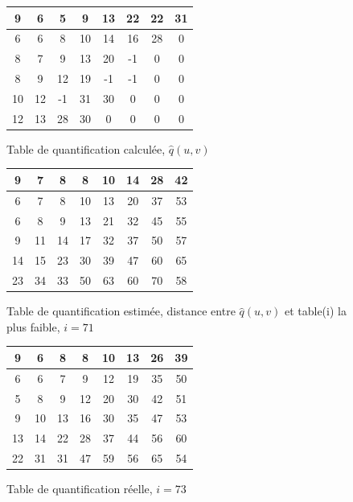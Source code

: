 \documentclass[utf8,final]{stageM2R} %
\begin{document}
\begin{figure}
  \centering
  \begin{tabular}{|c|c|c|c|c|c|c|c|}
    \hline
    9 & 6 & 5 & 9 & 13 & 22 & 22 & 31 \\ \hline    
    6 & 6 & 8 & 10 & 14 & 16 & 28 & 0 \\ \hline
    8 & 7 & 9 & 13 & 20 & -1 & 0 & 0 \\ \hline
    8 & 9 & 12 & 19 & -1 & -1 & 0 & 0 \\ \hline
    10 & 12 & -1 & 31 & 30 & 0 & 0 & 0 \\ \hline
    12 & 13 & 28 & 30 & 0 & 0 & 0 & 0 \\ \hline
  \end{tabular}
  \caption{Table de quantification calculée, $\widehat{q}(u,v)$}
  \label{periods1}
  
  \centering
  \begin{tabular}{|c|c|c|c|c|c|c|c|}
    \hline
    9 & 7 & 8 & 8 & 10 & 14 & 28 & 42 \\ \hline
    6 & 7 & 8 & 10 & 13 & 20 & 37 & 53 \\ \hline
    6 & 8 & 9 & 13 & 21 & 32 & 45 & 55 \\ \hline
    9 & 11 & 14 & 17 & 32 & 37 & 50 & 57 \\ \hline
    14 & 15 & 23 & 30 & 39 & 47 & 60 & 65 \\ \hline
    23 & 34 & 33 & 50 & 63 & 60 & 70 & 58 \\ \hline
  \end{tabular}
  \caption{Table de quantification estimée, distance entre $\widehat{q}(u,v)$ et table(i) la plus faible, $i = 71$}
  \label{periods2}
  
  \centering
  \begin{tabular}{|c|c|c|c|c|c|c|c|}
    \hline
    9 & 6 & 8 & 8 & 10 & 13 & 26 & 39  \\ \hline
    6 & 6 & 7 & 9 & 12 & 19 & 35 & 50  \\ \hline
    5 & 8 & 9 & 12 & 20 & 30 & 42 & 51  \\ \hline
    9 & 10 & 13 & 16 & 30 & 35 & 47 & 53  \\ \hline
    13 & 14 & 22 & 28 & 37 & 44 & 56 & 60  \\ \hline
    22 & 31 & 31 & 47 & 59 & 56 & 65 & 54  \\ \hline
  \end{tabular}
  \caption{Table de quantification réelle, $i = 73$}
  \label{periods3}
\end{figure}
\end{document}
